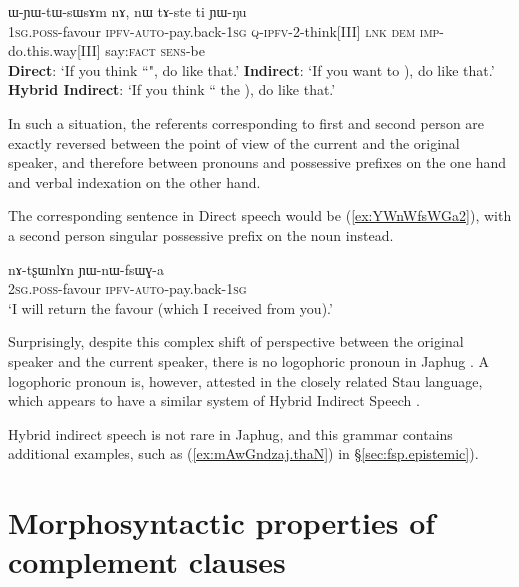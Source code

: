  \begin{exe}
 \ex \label{ex:YWnWfsWGa}
\gll  {}  ɯ-ɲɯ-tɯ-sɯsɤm nɤ, nɯ tɤ-ste ti ɲɯ-ŋu \\
  {\textsc{1sg}.\textsc{poss}-favour} {\textsc{ipfv}-\textsc{auto}-pay.back-\textsc{1sg}} \textsc{q}-\textsc{ipfv}-2-think[III] \textsc{lnk} \textsc{dem} \textsc{imp}-do.this.way[III] say:\textsc{fact} \textsc{sens}-be \\
\glt    \textbf{Direct}: `If you think ``", do like that.'
\glt    \textbf{Indirect}: `If you want to ), do like that.'
\glt   \textbf{Hybrid Indirect}: `If you think `` the ), do like that.'
\end{exe}

In such a situation, the referents corresponding to first and second person are exactly reversed between the point of view of the current and the original speaker, and therefore between pronouns and possessive prefixes on the one hand and verbal indexation on the other hand.
   
The corresponding sentence in Direct speech would be (\ref{ex:YWnWfsWGa2}), with a second person singular possessive prefix on the noun   instead.

\begin{exe}
\ex \label{ex:YWnWfsWGa2}
\gll nɤ-tʂɯnlɤn ɲɯ-nɯ-fsɯɣ-a \\
  {\textsc{2sg}.\textsc{poss}-favour} {\textsc{ipfv}-\textsc{auto}-pay.back-\textsc{1sg}} \\ 
 \glt `I will return the favour (which I received from you).'
\end{exe}


Surprisingly, despite this complex shift of perspective between the original speaker and the current speaker, there is no logophoric pronoun in Japhug \citep{hagege74logophoriques, nikitina12logophoric}. A logophoric pronoun is, however, attested in the closely related Stau language, which appears to have a similar system of Hybrid Indirect Speech \citep{jacques17stau}.

Hybrid indirect speech is not rare in Japhug, and this grammar contains additional examples, such as  (\ref{ex:mAwGndzaj.thaN}) in §\ref{sec:fsp.epistemic}).



\section{Morphosyntactic properties of complement clauses}  \label{sec:complement.morphosyntax}
